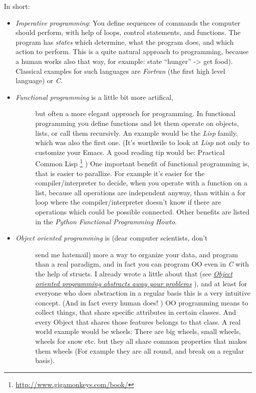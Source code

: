 \documentclass[letterpaper,10pt,english]{manual}
\begin{document}
In short:
\begin{itemize}
\item {} 
\emph{Imperative programming}: You define sequences of
commands the computer should perform, with help of loops,
control statements, and functions. The program has \emph{states}
which determine, what the program does, and which action to
perform. This is a quite natural approach to programming, because
a human works also that way, for example: state ``hunger'' -\textgreater{} get
food). Classical examples for such languages are \emph{Fortran} (the
first high level language) or \emph{C}.

\item {} \begin{description}
\item[\emph{Functional programming} is a little bit more artifical,] \leavevmode
but often a more elegant
approach for programming. In functional programming you define
functions and let them operate on objects, lists, or call them
recursivly. An example would be the \emph{Lisp} family, which was
also the first one. (It's worthwile to look at \emph{Lisp} not only
to customize your Emacs. A good reading tip would be: Practical
Common Lisp \footnote{
\href{http://www.gigamonkeys.com/book/}{http://www.gigamonkeys.com/book/}
} ) One important benefit of functional programming
is, that is easier to parallize. For example it's easier for the
compiler/interpreter to decide, when you operate with a function on a list,
because all operations are independent anyway, than within a for
loop where the compiler/interpreter doesn't know if there are operations
which could be possible connected. Other benefits are listed in
the \emph{Python Functional Programming Howto}.

\end{description}

\item {} \begin{description}
\item[\emph{Object oriented programming} is (dear computer scientists, don't] \leavevmode
send me hatemail) more a way to organize your data, and program
than a real paradigm, and in fact you can program OO even in \emph{C}
with the help of structs. I already wrote a little about
that (see \hyperlink{oo-ref}{\emph{Object oriented programming abstracts away your problems}} ), and at least for everyone who does
abstraction in a regular  basis this is a very intuitive concept.
(And in fact every human does! )
OO programming means to collect things, that share specific
attributes in certain classes. And every Object that shares
those features belongs to that class. A real world example
would be wheels: There are big wheels, small wheels, wheels
for snow etc. but they all share common properties that makes
them wheels (For example they are all round,
and break on a regular basis).

\end{description}

\end{itemize}
\end{document}
